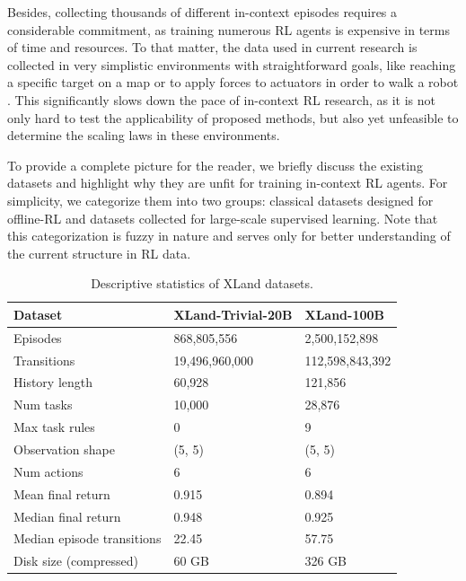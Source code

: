 \documentclass{article}
\begin{document}
Besides, collecting thousands of different in-context episodes requires a considerable commitment, as training numerous RL agents is expensive in terms of time and resources. To that matter, the data used in current research is collected in very simplistic environments with straightforward goals, like reaching a specific target on a map \citep{laskin2022context, lee2023supervised, zisman2023emergence} or to apply forces to actuators in order to walk a robot \citep{kirsch2023towards}. This significantly slows down the pace of in-context RL research, as it is not only hard to test the applicability of proposed methods, but also yet unfeasible to determine the scaling laws in these environments.

To provide a complete picture for the reader, we briefly discuss the existing datasets and highlight why they are unfit for training in-context RL agents. For simplicity, we categorize them into two groups: classical datasets designed for offline-RL and datasets collected for large-scale supervised learning. Note that this categorization is fuzzy in nature and serves only for better understanding of the current structure in RL data.

\begin{table}[t]
\centering
\caption{Descriptive statistics of XLand datasets.}
\label{table:data-stats}
\begin{tabular}{@{}lll@{}}
\toprule
\textbf{Dataset}                & \textbf{XLand-Trivial-20B} & \textbf{XLand-100B} \\ 
\midrule
Episodes                        & 868,805,556       & 2,500,152,898 \\
Transitions                     & 19,496,960,000    & 112,598,843,392 \\
History length                  & 60,928            & 121,856 \\
Num tasks                       & 10,000            & 28,876 \\
Max task rules                  & 0                 & 9 \\
Observation shape               & (5, 5)            & (5, 5) \\
Num actions                     & 6                 & 6 \\
\midrule
Mean final return  & 0.915 & 0.894 \\
Median final return  & 0.948 & 0.925 \\
Median episode transitions  & 22.45 & 57.75 \\
\midrule
Disk size (compressed)          & 60 GB             & 326 GB \\
\bottomrule
\end{tabular}
\vskip -0.1in
\end{table}
\end{document}
